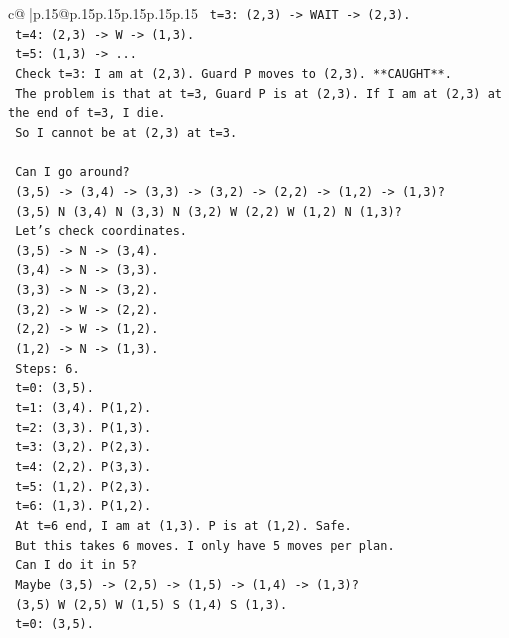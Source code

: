 \documentclass{article}
\begin{document}
{\begin{supertabular}{c@{$\;$}|p{.15\linewidth}@{}p{.15\linewidth}p{.15\linewidth}p{.15\linewidth}p{.15\linewidth}p{.15\linewidth}}
{{{\texttt{   t=3: (2,3) {-}> WAIT {-}> (2,3).} \\
\texttt{   t=4: (2,3) {-}> W {-}> (1,3).} \\
\texttt{   t=5: (1,3) {-}> ...} \\
\texttt{   Check t=3: I am at (2,3). Guard P moves to (2,3). **CAUGHT**.} \\
\texttt{   The problem is that at t=3, Guard P is at (2,3). If I am at (2,3) at the end of t=3, I die.} \\
\texttt{   So I cannot be at (2,3) at t=3.} \\
\\ 
\texttt{   Can I go around?} \\
\texttt{   (3,5) {-}> (3,4) {-}> (3,3) {-}> (3,2) {-}> (2,2) {-}> (1,2) {-}> (1,3)?} \\
\texttt{   (3,5) N (3,4) N (3,3) N (3,2) W (2,2) W (1,2) N (1,3)?} \\
\texttt{   Let's check coordinates.} \\
\texttt{   (3,5) {-}> N {-}> (3,4).} \\
\texttt{   (3,4) {-}> N {-}> (3,3).} \\
\texttt{   (3,3) {-}> N {-}> (3,2).} \\
\texttt{   (3,2) {-}> W {-}> (2,2).} \\
\texttt{   (2,2) {-}> W {-}> (1,2).} \\
\texttt{   (1,2) {-}> N {-}> (1,3).} \\
\texttt{   Steps: 6.} \\
\texttt{   t=0: (3,5).} \\
\texttt{   t=1: (3,4). P(1,2).} \\
\texttt{   t=2: (3,3). P(1,3).} \\
\texttt{   t=3: (3,2). P(2,3).} \\
\texttt{   t=4: (2,2). P(3,3).} \\
\texttt{   t=5: (1,2). P(2,3).} \\
\texttt{   t=6: (1,3). P(1,2).} \\
\texttt{   At t=6 end, I am at (1,3). P is at (1,2). Safe.} \\
\texttt{   But this takes 6 moves. I only have 5 moves per plan.} \\
\texttt{   Can I do it in 5?} \\
\texttt{   Maybe (3,5) {-}> (2,5) {-}> (1,5) {-}> (1,4) {-}> (1,3)?} \\
\texttt{   (3,5) W (2,5) W (1,5) S (1,4) S (1,3).} \\
\texttt{   t=0: (3,5).} \\
}}}
\end{supertabular}}
\end{document}

